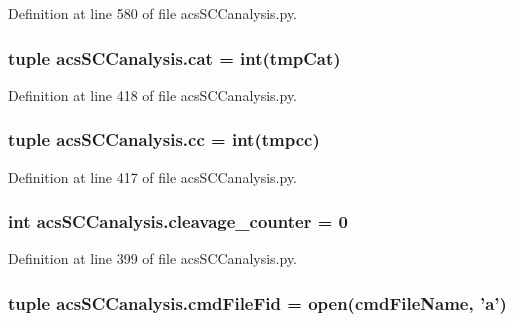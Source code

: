 Definition at line 580 of file acs\+S\+C\+Canalysis.\+py.

\hypertarget{a00130_aea872e34fe0da6302f6195f1b2315148}{
\subsubsection[{cat}]{\setlength{\rightskip}{0pt plus 5cm}tuple acs\+S\+C\+Canalysis.\+cat = int(tmp\+Cat)}}\label{a00130_aea872e34fe0da6302f6195f1b2315148}


Definition at line 418 of file acs\+S\+C\+Canalysis.\+py.

\hypertarget{a00130_a67fcb77a15f51e94c98bb48b05865715}{
\subsubsection[{cc}]{\setlength{\rightskip}{0pt plus 5cm}tuple acs\+S\+C\+Canalysis.\+cc = int(tmpcc)}}\label{a00130_a67fcb77a15f51e94c98bb48b05865715}


Definition at line 417 of file acs\+S\+C\+Canalysis.\+py.

\hypertarget{a00130_a0dd6730b063ac11ae4620c4a0778f6d9}{
\subsubsection[{cleavage\+\_\+counter}]{\setlength{\rightskip}{0pt plus 5cm}int acs\+S\+C\+Canalysis.\+cleavage\+\_\+counter = 0}}\label{a00130_a0dd6730b063ac11ae4620c4a0778f6d9}


Definition at line 399 of file acs\+S\+C\+Canalysis.\+py.

\hypertarget{a00130_a0a501feb02e67bd6a8ba75490709cf89}{
\subsubsection[{cmd\+File\+Fid}]{\setlength{\rightskip}{0pt plus 5cm}tuple acs\+S\+C\+Canalysis.\+cmd\+File\+Fid = open({\bf cmd\+File\+Name}, '{\bf a}')}}\label{a00130_a0a501feb02e67bd6a8ba75490709cf89}


